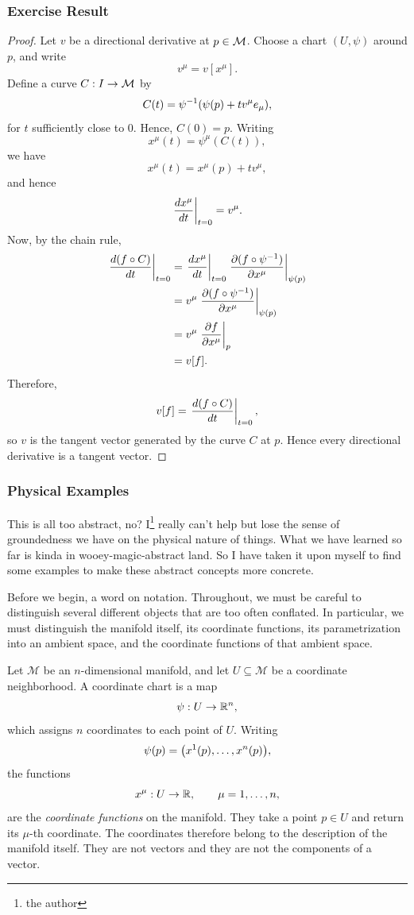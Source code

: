 		\subsubsection*{Exercise Result}
			\begin{proof}
				Let $v$ be a directional derivative at $p\in\mathcal M$. Choose a chart
				$(U,\psi)$ around $p$, and write
				\[
					v^\mu = v[x^\mu].
				\]
				Define a curve $C:I\to\mathcal M$ by
				\[
					C(t) = \psi\inv\pqty{\psi(p)+t v^\mu e_\mu},
				\]
				for $t$ sufficiently close to $0$. Hence, $C(0) = p$. Writing
				\[
					x^\mu(t) = \psi^\mu(C(t)),
				\]
				we have
				\[
					x^\mu(t)=x^\mu(p)+t v^\mu,
				\]
				and hence
				\[
					\eval{\dv{x^\mu}{t}}_{t=0}=v^\mu.
				\]
				Now, by the chain rule,
				\begin{align}
					\eval{\dv{(f\circ C)}{t}}_{t=0}
					&=
					\eval{\dv{x^\mu}{t}}_{t=0}
					\eval{
						\pdv{(f\circ\psi\inv)}{x^\mu}
					}_{\psi(p)} \\
					&=
					v^\mu
					\eval{
						\pdv{(f\circ\psi\inv)}{x^\mu}
					}_{\psi(p)} \\
					&=
					v^\mu
					\eval{
						\pdv{f}{x^\mu}
					}_{p} \\
					&= v[f].
				\end{align}
				Therefore,
				\[
					v[f]
					=
					\eval{\dv{(f\circ C)}{t}}_{t=0},
				\]
				so $v$ is the tangent vector generated by the curve $C$ at $p$.
				Hence every directional derivative is a tangent vector.
			\end{proof}
	\subsubsection{Physical Examples}
		This is all too abstract, no? I\footnote{the author} really can't
		help but lose the sense of groundedness we have on the physical nature of things.
		What we have learned so far is kinda in wooey-magic-abstract land. So
		I have taken it upon myself to find some examples to make these
		abstract concepts more concrete.

		Before we begin, a word on notation. Throughout, we must be careful
		to distinguish several different objects that are too often conflated.
		In particular, we must distinguish the manifold itself, its coordinate
		functions, its parametrization into an ambient space, and the coordinate
		functions of that ambient space.

		Let $\mathcal M$ be an $n$-dimensional manifold, and let
		$U\subseteq\mathcal M$ be a coordinate neighborhood. A coordinate chart
		is a map
		\[
			\psi:U\to\mathbb{R}^n,
		\]
		which assigns $n$ coordinates to each point of $U$. Writing
		\[
			\psi(p)
			=
			\pqty{x^1(p),\ldots,x^n(p)},
		\]
		the functions
		\[
			x^\mu:U\to\mathbb{R},
			\qquad
			\mu=1,\ldots,n,
		\]
		are the \textit{coordinate functions} on the manifold. They take a
		point $p\in U$ and return its $\mu$-th coordinate. The coordinates
		therefore belong to the description of the manifold itself. They are
		not vectors and they are not the components of a vector.

